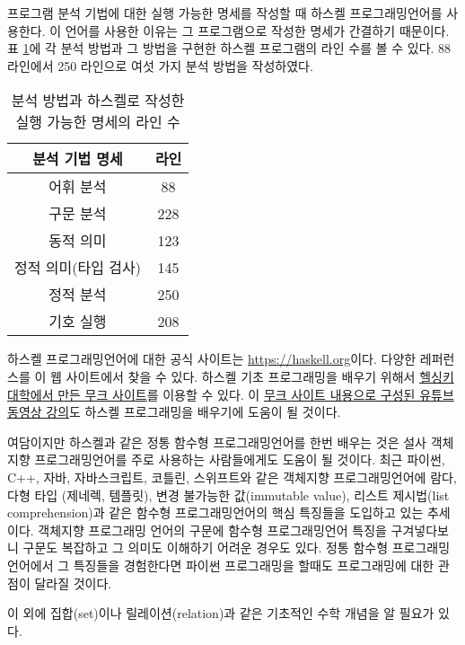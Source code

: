 \documentclass[a4paper]{book}
\begin{document}
프로그램 분석 기법에 대한 실행 가능한 명세를 작성할 때 하스켈
프로그래밍언어를 사용한다. 이 언어를 사용한 이유는 그 프로그램으로
작성한 명세가 간결하기 때문이다. 표 \ref{table:lines}에 각 분석 방법과
그 방법을 구현한 하스켈 프로그램의 라인 수를 볼 수 있다. 88 라인에서
250 라인으로 여섯 가지 분석 방법을 작성하였다.

\begin{table}[ht]
\begin{center}
  \begin{tabular}{|c|c|}\hline
    분석 기법 명세 & 라인 \\\hline\hline
    어휘 분석 & 88 \\\hline
    구문 분석 & 228 \\\hline
    동적 의미 & 123 \\\hline
    정적 의미(타입 검사) & 145 \\\hline
    정적 분석 & 250 \\\hline
    기호 실행 & 208 \\\hline
  \end{tabular}
\end{center}
\caption{분석 방법과 하스켈로 작성한 실행 가능한 명세의 라인 수}
\label{table:lines}
\end{table}

하스켈 프로그래밍언어에 대한 공식 사이트는
\href{https://haskell.org}{https://haskell.org}이다. 다양한 레퍼런스를
이 웹 사이트에서 찾을 수 있다. 하스켈 기초 프로그래밍을 배우기 위해서
\href{https://haskell.mooc.fi/}{헬싱키 대학에서 만든 무크 사이트}를
이용할 수 있다. 이
\href{https://www.youtube.com/playlist?list=PLhbaMvGyp99_NphAX7k5OqcM1fXLZne8t}{무크
  사이트 내용으로 구성된 유튜브 동영상 강의}도 하스켈 프로그래밍을
배우기에 도움이 될 것이다.

여담이지만 하스켈과 같은 정통 함수형 프로그래밍언어를 한번 배우는 것은
설사 객체지향 프로그래밍언어를 주로 사용하는 사람들에게도 도움이 될
것이다.  최근 파이썬, C++, 자바, 자바스크립트, 코틀린, 스위프트와 같은
객체지향 프로그래밍언어에 람다, 다형 타입 (제네렉, 템플릿), 변경
불가능한 값(immutable value), 리스트 제시법(list comprehension)과 같은
함수형 프로그래밍언어의 핵심 특징들을 도입하고 있는 추세이다. 객체지향
프로그래밍 언어의 구문에 함수형 프로그래밍언어 특징을 구겨넣다보니
구문도 복잡하고 그 의미도 이해하기 어려운 경우도 있다.  정통 함수형
프로그래밍언어에서 그 특징들을 경험한다면 파이썬 프로그래밍을 할때도
프로그래밍에 대한 관점이 달라질 것이다.

이 외에 집합(set)이나 릴레이션(relation)과 같은 기초적인 수학 개념을
알 필요가 있다.
\end{document}
